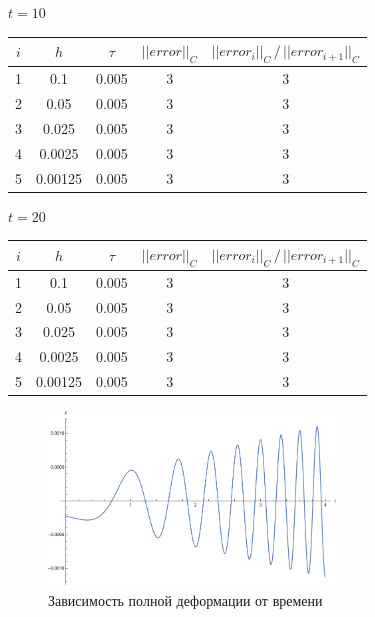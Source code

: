 \documentclass[12pt,a4paper]{article}
\begin{document}
\begin{enumerate}
    \vspace{1cm}

    \centerline{$t = 10$}
    \vspace{0.5em}
    \begin{center}
      \begin{tabular}{|c|c|c|c|c|}
        \hline
        $i$ & $h$     & $\tau$ & $|| error ||_C$ & $|| error_i ||_C \, / \, || error_{i+1} ||_C$ \\
        \hline
        1   & 0.1     & 0.005  & 3 & 3 \\
        \hline 
        2   & 0.05    & 0.005  & 3 & 3 \\
        \hline
        3   & 0.025   & 0.005  & 3 & 3 \\
        \hline
        4   & 0.0025  & 0.005  & 3 & 3 \\
        \hline 
        5   & 0.00125 & 0.005  & 3 & 3 \\
        \hline
      \end{tabular}
    \end{center}

    \pagebreak

    \centerline{$t = 20$}
    \vspace{0.5em}
    \begin{center}
      \begin{tabular}{|c|c|c|c|c|}
        \hline
        $i$ & $h$     & $\tau$ & $|| error ||_C$ & $|| error_i ||_C \, / \, || error_{i+1} ||_C$ \\
        \hline
        1   & 0.1     & 0.005  & 3 & 3 \\
        \hline 
        2   & 0.05    & 0.005  & 3 & 3 \\
        \hline
        3   & 0.025   & 0.005  & 3 & 3 \\
        \hline
        4   & 0.0025  & 0.005  & 3 & 3 \\
        \hline 
        5   & 0.00125 & 0.005  & 3 & 3 \\
        \hline
      \end{tabular}
    \end{center}

    \vspace{0.5em}

    \begin{figure}[h]
      \centering
      \includegraphics[width=0.68\textwidth]{T2/h_1_tau_0.005/epsilon(t).pdf}
      \caption{Зависимость полной деформации от времени}
    \end{figure}


\end{enumerate}
\end{document}
